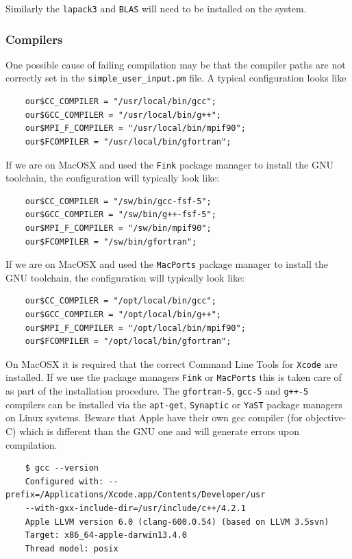\documentclass[a4paper,11pt]{article}
\begin{document}
Similarly the \texttt{lapack3} and \texttt{BLAS} will need to be installed on the system.

\subsubsection{Compilers}

One possible cause of failing compilation may be that the compiler paths are not correctly set in the \texttt{simple\_user\_input.pm} file. A typical configuration looks like

\begin{verbatim}
    our$CC_COMPILER = "/usr/local/bin/gcc";
    our$GCC_COMPILER = "/usr/local/bin/g++";
    our$MPI_F_COMPILER = "/usr/local/bin/mpif90";
    our$FCOMPILER = "/usr/local/bin/gfortran";
\end{verbatim}

If we are on MacOSX and used the \texttt{Fink} package manager to install the GNU toolchain, the configuration will typically look like:

\begin{verbatim}
    our$CC_COMPILER = "/sw/bin/gcc-fsf-5";
    our$GCC_COMPILER = "/sw/bin/g++-fsf-5";
    our$MPI_F_COMPILER = "/sw/bin/mpif90";
    our$FCOMPILER = "/sw/bin/gfortran";
\end{verbatim}

If we are on MacOSX and used the \texttt{MacPorts} package manager to install the GNU toolchain, the configuration will typically look like:

\begin{verbatim}
    our$CC_COMPILER = "/opt/local/bin/gcc";
    our$GCC_COMPILER = "/opt/local/bin/g++";
    our$MPI_F_COMPILER = "/opt/local/bin/mpif90";
    our$FCOMPILER = "/opt/local/bin/gfortran";
\end{verbatim}

On MacOSX it is required that the correct Command Line Tools for \texttt{Xcode} are installed. If we use the package managers \texttt{Fink} or \texttt{MacPorts} this is taken care of as part of the installation procedure. The \texttt{gfortran-5},  \texttt{gcc-5} and \texttt{g++-5} compilers can be installed via the \texttt{apt-get}, \texttt{Synaptic} or \texttt{YaST} package managers on Linux systems. Beware that Apple have their own gcc compiler (for objective-C) which is different than the GNU one and will generate errors upon compilation.

\begin{verbatim}
    $ gcc --version 
    Configured with: --prefix=/Applications/Xcode.app/Contents/Developer/usr
    --with-gxx-include-dir=/usr/include/c++/4.2.1
    Apple LLVM version 6.0 (clang-600.0.54) (based on LLVM 3.5svn)
    Target: x86_64-apple-darwin13.4.0
    Thread model: posix
\end{verbatim}
\end{document}
